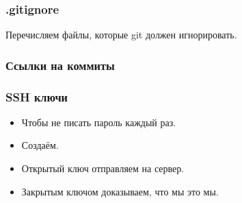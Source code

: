 \documentclass[pdf,russian,aspectratio=169]{beamer}
\begin{document}
\begin{frame}
    \frametitle{.gitignore}
    Перечисляем файлы, которые git должен игнорировать.
\end{frame}

\begin{frame}
    \frametitle{Ссылки на коммиты}
\end{frame}

\begin{frame}
    \frametitle{SSH ключи}
    \begin{itemize}
        \item Чтобы не писать пароль каждый раз.
        \pause
        \item Создаём.
        \pause
        \item Открытый ключ отправляем на сервер.
        \pause
        \item Закрытым ключом доказываем, что мы это мы.
    \end{itemize}
\end{frame}
\end{document}
